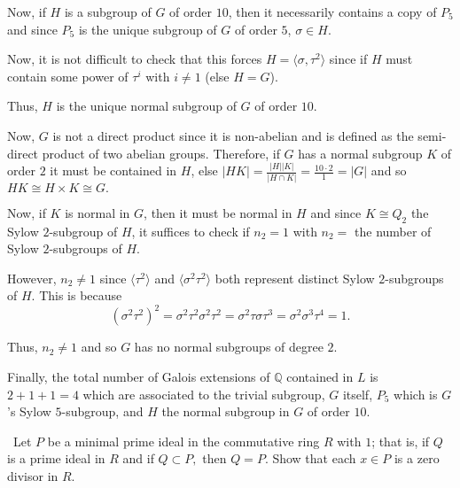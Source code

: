 \documentclass[12pt]{Qual}
\begin{document}
\begin{solution}
Now, if $H$ is a subgroup of $G$ of order $10$, then it necessarily contains a copy of $P_5$ and since $P_5$ is the unique subgroup of $G$ of order $5$, $\sigma\in H$.

Now, it is not difficult to check that this forces $H=\langle \sigma,\tau^2\rangle$ since if $H$ must contain some power of $\tau^i$ with $i\not=1$ (else $H=G$).

Thus, $H$ is the unique normal subgroup of $G$ of order $10.$

Now, $G$ is not a direct product since it is non-abelian and is defined as the semi-direct product of two abelian groups. Therefore, if $G$ has a normal subgroup $K$ of order $2$ it must be contained in $H$, else $|HK|=\frac{|H||K|}{|H\cap K|}=\frac{10\cdot 2}{1}=|G|$ and so $HK\cong H\times K\cong G.$

Now, if $K$ is normal in $G$, then it must be normal in $H$ and since $K\cong Q_2$ the Sylow $2$-subgroup of $H$, it suffices to check if $n_2=1$ with $n_2=$ the number of Sylow $2$-subgroups of $H$.

However, $n_2\not=1$ since $\langle \tau^2\rangle$ and $\langle \sigma^2\tau^2\rangle$ both represent distinct Sylow $2$-subgroups of $H$. This is because $$(\sigma^2\tau^2)^2=\sigma^2\tau^2\sigma^2\tau^2=\sigma^2\tau\sigma\tau^3=\sigma^2\sigma^3\tau^4=1.$$

Thus, $n_2\not=1$ and so $G$ has no normal subgroups of degree $2.$

Finally, the total number of Galois extensions of $\mathbb{Q}$ contained in $L$ is $2+1+1=4$ which are associated to the trivial subgroup, $G$ itself, $P_5$ which is $G$'s Sylow $5$-subgroup, and $H$ the normal subgroup in $G$ of order $10.$
\end{solution}
\newpage

\begin{problem} $\,$
Let $P$ be a minimal prime ideal in the commutative ring $R$ with $1$; that is, if $Q$ is a prime ideal in $R$ and if $Q\subset P,$ then $Q=P$. Show that each $x\in P$ is a zero divisor in $R.$
\end{problem}
\end{document}
